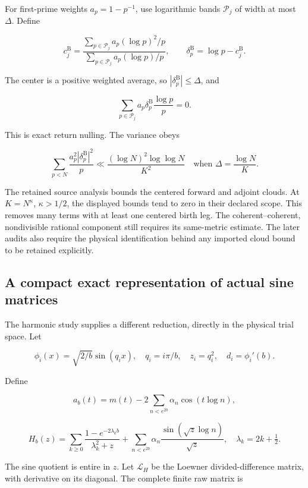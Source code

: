 \documentclass[
  10pt,
  a4paper,
  10pt,
  oneside,
  openany]{book}
\begin{document}
For first-prime weights \(a_p=1-p^{-1}\), use logarithmic bands
\(\mathcal P_j\) of width at most \(\Delta\). Define

\[
c_j^{\mathrm B}
=\frac{\sum_{p\in\mathcal P_j}a_p(\log p)^2/p}
{\sum_{p\in\mathcal P_j}a_p(\log p)/p},
\qquad \delta_p^{\mathrm B}=\log p-c_j^{\mathrm B}.
\tag{14.5}\label{eq:14.5}
\]

The center is a positive weighted average, so
\(|\delta_p^{\mathrm B}|\le\Delta\), and

\[
\sum_{p\in\mathcal P_j}a_p\delta_p^{\mathrm B}\frac{\log p}{p}=0.
\tag{14.6}\label{eq:14.6}
\]

This is exact return nulling. The variance obeys

\[
\sum_{p<N}\frac{a_p^2|\delta_p^{\mathrm B}|^2}{p}
\ll\frac{(\log N)^2\log\log N}{K^2}
\quad\text{when }\Delta=\frac{\log N}{K}.
\tag{14.7}\label{eq:14.7}
\]

The retained source analysis bounds the centered forward and adjoint
clouds. At \(K=N^\kappa\), \(\kappa>1/2\), the displayed bounds tend to
zero in their declared scope. This removes many terms with at least one
centered birth leg. The coherent--coherent, nondivisible rational
component still requires its same-metric estimate. The later audits also
require the physical identification behind any imported cloud bound to
be retained explicitly.

\subsection{A compact exact representation of actual sine
matrices}\label{a-compact-exact-representation-of-actual-sine-matrices}

The harmonic study supplies a different reduction, directly in the
physical trial space. Let

\[
\phi_i(x)=\sqrt{2/b}\sin(q_ix),\quad q_i=i\pi/b,
\quad z_i=q_i^2,\quad d_i=\phi_i'(b).
\tag{14.8}\label{eq:14.8}
\]

Define

\[
a_b(t)=m(t)-2\sum_{n<e^{2b}}\alpha_n\cos(t\log n),
\tag{14.9}\label{eq:14.9}
\]

\[
H_b(z)=\sum_{k\ge0}\frac{1-e^{-2\lambda_kb}}{\lambda_k^2+z}
+\sum_{n<e^{2b}}\alpha_n\frac{\sin(\sqrt z\log n)}{\sqrt z},
\quad \lambda_k=2k+\tfrac12.
\tag{14.10}\label{eq:14.10}
\]

The sine quotient is entire in \(z\). Let \(\mathcal L_H\) be the
Loewner divided-difference matrix, with derivative on its diagonal. The
complete finite raw matrix is
\end{document}
